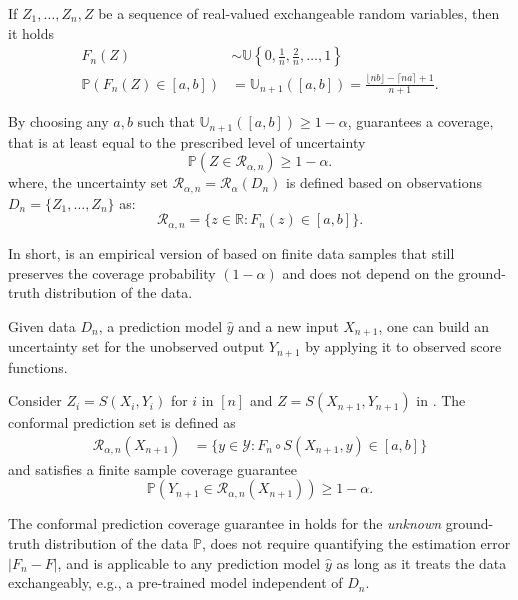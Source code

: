 \begin{lemma}\label{lm:PIT_onedim}
If $Z_1, \dots, Z_n, Z$ be a sequence of real-valued exchangeable random variables, then it holds
\begin{align*}
 F_n(Z) &\sim \mathbb{U}\left\{0, \frac1n, \frac2n, \ldots, 1\right\} \\
\mathbb{P}(F_n(Z) \in [a, b]) &= \mathbb{U}_{n+1}([a, b])
= \frac{\lfloor n b\rfloor - \lceil n a\rceil + 1}{n+1} .
\end{align*}
\end{lemma}
By choosing any $a, b$ such that $\mathbb{U}_{n+1}([a, b]) \geq 1 - \alpha$,  guarantees  a coverage, that is at least equal to the prescribed level of uncertainty
\begin{equation*}
\mathbb{P}\left(Z \in \mathcal{R}_{\alpha, n}\right) \geq 1 - \alpha.
\end{equation*}
where, the uncertainty set $\mathcal{R}_{\alpha, n} = \mathcal{R}_{\alpha}(D_n)$ is defined based on observations $D_n = \{Z_1, \ldots, Z_n\}$ as:
\begin{equation}\label{eq:empirical_uq}
    \mathcal{R}_{\alpha, n} = \big\{z \in \mathbb{R} : F_n(z) \in [a, b]\big\} .
\end{equation}

In short,  is an empirical version of  based on finite data samples that still preserves the coverage probability $(1-\alpha)$ and does not depend on the ground-truth distribution of the data.

Given data $D_n$,
a prediction model $\hat y$ and a new input $X_{n+1}$, one can build an uncertainty set for the unobserved output $Y_{n+1}$ by applying it to observed score functions. 

\begin{proposition}\label{prop:Univariate_Conformal_prediction_Coverage}
Consider $Z_i = S(X_i, Y_i)$ for $i$ in $[n]$ and $Z=S(X_{n+1}, Y_{n+1})$ in .
The conformal prediction set is defined as
\begin{align*}
\mathcal{R}_{\alpha, n}(X_{n+1}) &= \big\{y \in \mathcal{Y} : F_n \circ S(X_{n+1}, y) \in [a, b]\big\} 
\end{align*}
and satisfies a finite sample coverage guarantee
$$
\mathbb{P}\left(Y_{n+1} \in \mathcal{R}_{\alpha, n}(X_{n+1})\right) \geq 1 - \alpha.
$$
\end{proposition}
The conformal prediction coverage guarantee in  holds for the \emph{unknown} ground-truth distribution of the data $\mathbb{P}$, does not require quantifying the estimation error $|F_n - F|$, and is applicable to any prediction model $\hat y$ as long as it treats the data exchangeably, e.g., a pre-trained model independent of $D_n$.

